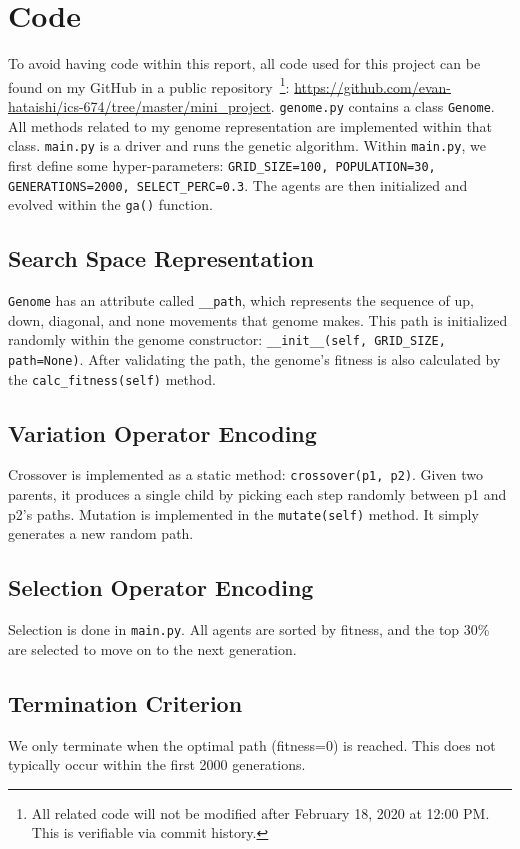 
\section{Code}

To avoid having code within this report, all code used for this project can be found on my GitHub in a public repository~\footnote{All related code will not be modified after February 18, 2020 at 12:00 PM. This is verifiable via commit history.}: \url{https://github.com/evan-hataishi/ics-674/tree/master/mini_project}. \texttt{genome.py} contains a class \texttt{Genome}. All methods related to my genome representation are implemented within that class. \texttt{main.py} is a driver and runs the genetic algorithm. Within \texttt{main.py}, we first define some hyper-parameters: \texttt{GRID\_SIZE=100, POPULATION=30, GENERATIONS=2000, SELECT\_PERC=0.3}. The agents are then initialized and evolved within the \texttt{ga()} function.

\subsection{Search Space Representation}

 \texttt{Genome} has an attribute called \texttt{\_\_path}, which represents the sequence of up, down, diagonal, and none movements that genome makes. This path is initialized randomly within the genome constructor: \texttt{\_\_init\_\_(self, GRID\_SIZE, path=None)}. After validating the path, the genome's fitness is also calculated by the \texttt{calc\_fitness(self)} method.

 \subsection{Variation Operator Encoding}
Crossover is implemented as a static method: \texttt{crossover(p1, p2)}. Given two parents, it produces a single child by picking each step randomly between p1 and p2's paths. Mutation is implemented in the \texttt{mutate(self)} method. It simply generates a new random path.

 \subsection{Selection Operator Encoding}
Selection is done in \texttt{main.py}. All agents are sorted by fitness, and the top 30\% are selected to move on to the next generation.

 \subsection{Termination Criterion}
We only terminate when the optimal path (fitness=0) is reached. This does not typically occur within the first 2000 generations.
